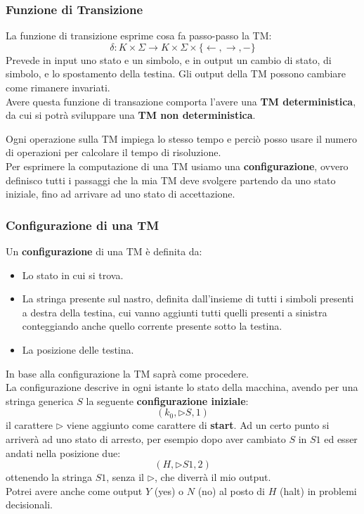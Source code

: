 \subsubsection{Funzione di Transizione}
\begin{definizione}
  La funzione di transizione esprime cosa fa passo-passo la TM:
  \[\delta:K\times\Sigma\to K\times \Sigma\times\{\leftarrow,\rightarrow,-\}\]
  Prevede in input uno stato e un simbolo, e in output un cambio
  di stato, di simbolo, e lo spostamento della testina. 
  Gli output della TM possono cambiare come rimanere invariati.\\
  Avere questa funzione di transazione comporta l'avere una
  \textbf{TM deterministica}, da cui si potrà sviluppare una \textbf{TM non
    deterministica}.
\end{definizione}
Ogni operazione sulla TM impiega lo stesso tempo e perciò posso usare il numero di
operazioni per calcolare il tempo di risoluzione.\\
Per esprimere la computazione di una TM usiamo una \textbf{configurazione},
ovvero definisco tutti i passaggi che la mia TM deve svolgere partendo da uno stato iniziale, 
fino ad arrivare ad uno stato di accettazione.

\subsubsection{Configurazione di una TM}
\begin{definizione}
  Un \textbf{configurazione} di una TM è definita da:
  \begin{itemize}
    \item Lo stato in cui si trova.
    \item La stringa presente sul nastro, definita dall'insieme di tutti i simboli presenti a destra della testina, cui vanno aggiunti tutti quelli presenti a sinistra conteggiando anche quello corrente presente sotto la testina. 
    \item La posizione delle testina. 
  \end{itemize}
  In base alla configurazione la TM saprà come procedere.\\
  La configurazione descrive in ogni istante lo stato della macchina, avendo per una stringa generica $S$ la seguente \textbf{configurazione iniziale}:
  \[(k_0,\triangleright S, 1)\]
  il carattere $\triangleright$ viene aggiunto come carattere di \textbf{start}.
  Ad un certo punto si arriverà ad uno stato di arresto, per esempio dopo
  aver cambiato $S$ in $S1$ ed esser andati nella posizione due:
  \[(H,\triangleright S1, 2)\]
  ottenendo la stringa $S1$, senza il $\triangleright$, che diverrà il mio output.\\
  Potrei avere anche come output $Y$ (yes) o $N$ (no) al posto di $H$ (halt) in problemi decisionali.
\end{definizione}
